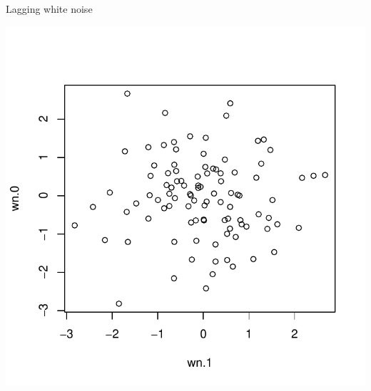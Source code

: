 \begin{frame}[fragile]{Lagging white noise}
  
\begin{knitrout}
\color{fgcolor}\begin{kframe}
\begin{alltt}
\hlkwb{=}\hlstd{(}\hlkwb{=}\hlstd{) ;} 
\end{alltt}
\end{kframe}
\includegraphics[width=\maxwidth]{figure/ipswich-1} 

\end{knitrout}
  
\end{frame}


